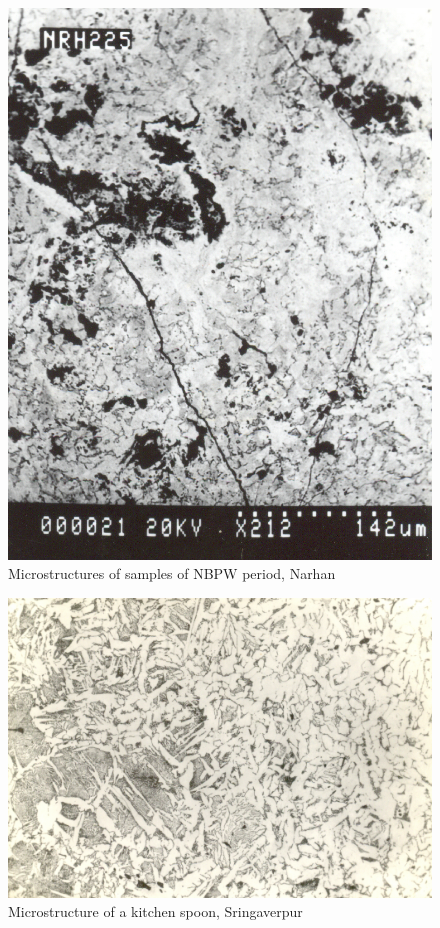 \begin{figure}[H]
\renewcommand{\thefigure}{26D}
\includegraphics[scale=0.65]{images/chapter-4/fig026D.jpg}
\caption{Microstructures of samples of NBPW period, Narhan}\label{chapter-4-fig26D}
\end{figure}

\newpage

\begin{figure}[H]
\renewcommand{\thefigure}{27A}
\includegraphics[scale=0.65]{images/chapter-4/fig027A.jpg}
\caption{Microstructure of a kitchen spoon, Sringaverpur}\label{chapter-4-fig27A}
\end{figure}

